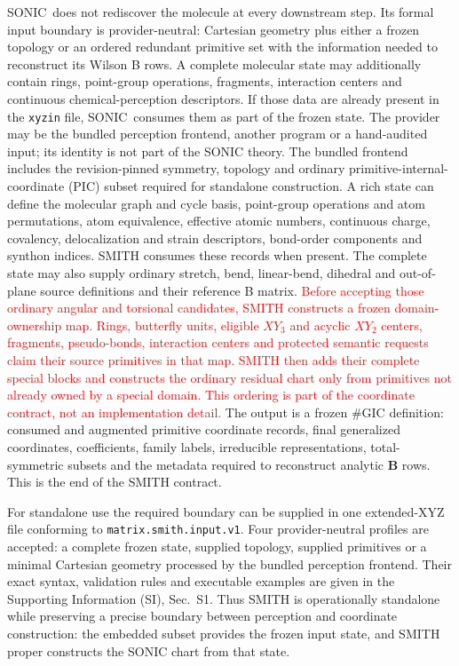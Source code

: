 \documentclass[journal=jctcce,manuscript=article,layout=traditional]{achemso}
\newcommand{\SONIC}{SONIC}
\newcommand{\Bmat}{\mathbf{B}}
\theoremstyle{definition}
\begin{document}
\SONIC\ does not rediscover the molecule at every downstream step.  Its formal
input boundary is provider-neutral: Cartesian geometry plus either a frozen
topology or an ordered redundant primitive set with the information needed to
reconstruct its Wilson B rows.  A complete molecular state may additionally
contain rings, point-group operations, fragments, interaction centers and
continuous chemical-perception descriptors.  If those data are already
present in the \texttt{xyzin} file, \SONIC\ consumes them as part of the frozen
state.  The provider may be the bundled perception frontend, another program or a
hand-audited input; its identity is not part of the SONIC theory.  The bundled
frontend includes the revision-pinned symmetry, topology and ordinary
primitive-internal-coordinate (PIC) subset required for standalone
construction.  A rich state
can define the molecular graph and cycle basis, point-group operations and atom
permutations, atom equivalence, effective atomic numbers, continuous charge,
covalency, delocalization and strain descriptors, bond-order components and
synthon indices.  SMITH consumes these records when present.  The complete
state may also supply ordinary stretch, bend, linear-bend, dihedral and
out-of-plane source definitions and their reference B matrix.
\textcolor{red}{Before accepting those ordinary angular and torsional
candidates, SMITH constructs a frozen domain-ownership map.  Rings, butterfly
units, eligible \(XY_3\) and acyclic \(XY_2\) centers, fragments, pseudo-bonds,
interaction centers and protected semantic requests claim their source
primitives in that map.  SMITH then adds their complete special blocks and
constructs the ordinary residual chart only from primitives not already owned
by a special domain.  This ordering is part of the coordinate contract, not an
implementation detail.}
The output is a frozen \(\#\)GIC definition: consumed and augmented primitive coordinate records,
final generalized coordinates, coefficients, family labels, irreducible
representations, total-symmetric subsets and the metadata required to
reconstruct analytic \(\Bmat\) rows.  This is the end of the SMITH contract.

For standalone use the required boundary can be supplied in one extended-XYZ
file conforming to \texttt{matrix.smith.input.v1}.  Four provider-neutral
profiles are accepted: a complete frozen state, supplied topology, supplied
primitives or a minimal Cartesian geometry processed by the bundled perception
frontend.  Their exact syntax, validation rules and executable examples are
given in the Supporting Information (SI), Sec.~S1.  Thus SMITH is operationally
standalone while preserving a precise boundary between perception and
coordinate construction: the embedded subset provides the frozen input state,
and SMITH proper constructs the SONIC chart from that state.
\end{document}
